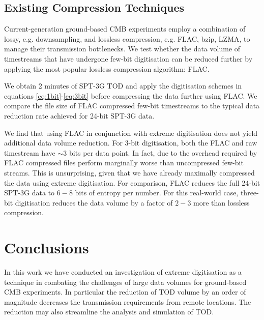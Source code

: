 \documentclass[a4paper,fleqn,usenatbib]{mnras}
\begin{document}

\subsection{Existing Compression Techniques}

Current-generation ground-based CMB experiments employ a combination of lossy, e.g. downsampling, and lossless compression, e.g. FLAC, bzip, LZMA, to manage their transmission bottlenecks. We test whether the data volume of timestreams that have undergone few-bit digitisation can be reduced further by applying the most popular lossless compression algorithm: FLAC.

We obtain 2 minutes of SPT-3G TOD and apply the digitisation schemes in equations \ref{eq:1bit}-\ref{eq:3bit} before compressing the data further using FLAC. We compare the file size of FLAC compressed few-bit timestreams to the typical data reduction rate achieved for 24-bit SPT-3G data.

We find that using FLAC in conjunction with extreme digitisation does not yield additional data volume reduction. For 3-bit digitisation, both the FLAC and raw timestream have $\sim$3 bits per data point. In fact, due to the overhead required by FLAC compressed files perform marginally worse than uncompressed few-bit streams. This is unsurprising, given that we have already maximally compressed the data using extreme digitisation. For comparison, FLAC reduces the full 24-bit  SPT-3G data to $6-8$ bits of entropy per number. For this real-world case, three-bit digitisation reduces the data volume by a factor of $2-3$ more than lossless compression.

\section{Conclusions}
\label{sec:conclusions}

In this work we have conducted an investigation of extreme digitisation as a technique in combating the challenges of large data volumes for ground-based CMB experiments. In particular the reduction of TOD volume by an order of magnitude decreases the transmission requirements from remote locations. The reduction may also streamline the analysis and simulation of TOD.
\end{document}
